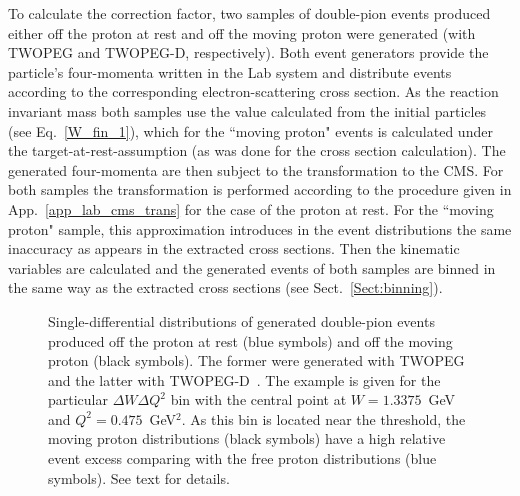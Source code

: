 To calculate the correction factor, two samples of double-pion events produced either off the proton at rest and off the moving proton were generated (with TWOPEG and TWOPEG-D, respectively). Both event generators provide the particle's four-momenta written in the Lab system and distribute events according to the corresponding electron-scattering cross section. As the reaction invariant mass both samples use the value calculated from the initial particles (see Eq.~\eqref{W_fin_1}), which for the ``moving proton" events is calculated under the target-at-rest-assumption (as was done for the cross section calculation). The generated four-momenta are then subject to the transformation to the CMS. For both samples the transformation is performed according to the procedure given in App.~\ref{app_lab_cms_trans} for the case of the proton at rest. For the ``moving proton" sample, this approximation introduces in the event distributions the same inaccuracy as appears in the extracted cross sections. Then the kinematic variables are calculated and the generated events of both samples are binned in the same way as the extracted cross sections (see Sect.~\ref{Sect:binning}). 


\begin{figure}[htp]
\begin{center}
\caption{\small Single-differential distributions of generated double-pion events produced off the proton at rest (blue symbols) and off the moving proton (black symbols). The former were generated with TWOPEG~\cite{twopeg} and the latter with TWOPEG-D~\cite{twopeg-d}. The example is given for the particular $\Delta W \Delta Q^{2}$ bin with the central point at $W=1.3375$~GeV and $Q^{2}=0.475$~GeV$^{2}$. As this bin is located near the threshold, the moving proton distributions (black symbols) have a high relative event excess comparing with the free proton distributions (blue symbols). See text for details. } \label{ferm_cor_1diff_1}
\end{center}
\end{figure}

